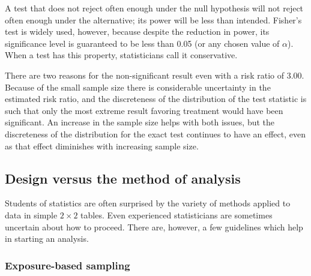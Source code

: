 A test that does not reject often enough under the null hypothesis will not reject often enough under the alternative; its power will be less than intended. Fisher's test is widely used, however, because despite the reduction in power, its significance level is guaranteed to be less than 0.05 (or any chosen value of $\alpha$).  When a test has this property, statisticians call it conservative.

There are two reasons for the non-significant result even with a risk ratio of 3.00.  Because of the small sample size there is considerable uncertainty in the estimated risk ratio, and the discreteness of the distribution of the test statistic is such that only the most extreme result favoring treatment would have been significant.  An increase in the sample size helps with both issues, but the discreteness of the distribution for the exact test continues to have an effect, even as that effect diminishes with increasing sample size.


\subsection{Design versus the method of analysis}
\label{designVsAnalysisBinaryData}

Students of statistics are often surprised by the variety of methods applied to data in simple $2 \times 2$ tables.  Even experienced statisticians are sometimes uncertain about how to proceed.  There are, however, a few guidelines which help in starting an analysis.


\subsubsection{Exposure-based sampling}


